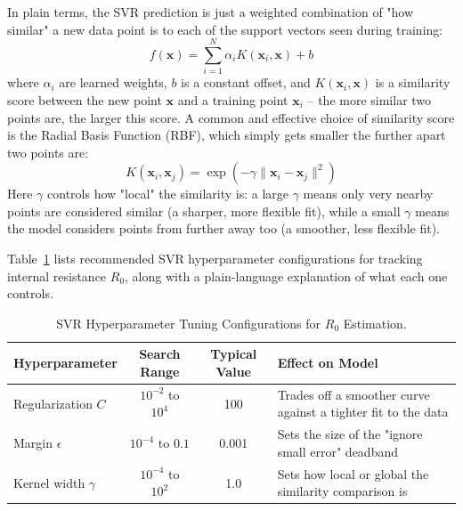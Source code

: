 In plain terms, the SVR prediction is just a weighted combination of "how similar" a new data point is to each of the support vectors seen during training:
\begin{equation}
f(\mathbf{x}) = \sum_{i=1}^N \alpha_i K(\mathbf{x}_i, \mathbf{x}) + b
\label{eq:ch8_svr_predict}
\end{equation}
where $\alpha_i$ are learned weights, $b$ is a constant offset, and $K(\mathbf{x}_i, \mathbf{x})$ is a similarity score between the new point $\mathbf{x}$ and a training point $\mathbf{x}_i$ -- the more similar two points are, the larger this score. A common and effective choice of similarity score is the Radial Basis Function (RBF), which simply gets smaller the further apart two points are:
\begin{equation}
K(\mathbf{x}_i, \mathbf{x}_j) = \exp\left( -\gamma \|\mathbf{x}_i - \mathbf{x}_j\|^2 \right)
\label{eq:ch8_rbf_kernel}
\end{equation}
Here $\gamma$ controls how "local" the similarity is: a large $\gamma$ means only very nearby points are considered similar (a sharper, more flexible fit), while a small $\gamma$ means the model considers points from further away too (a smoother, less flexible fit).

Table~\ref{tab:ch8_svr_hyperparams} lists recommended SVR hyperparameter configurations for tracking internal resistance $R_0$, along with a plain-language explanation of what each one controls.

\begin{table}[htbp]
\centering
\caption{SVR Hyperparameter Tuning Configurations for $R_0$ Estimation.}
\label{tab:ch8_svr_hyperparams}
\renewcommand{\arraystretch}{1.3}
\footnotesize
\begin{tabularx}{\textwidth}{|p{2.6cm}|c|c|X|}
\hline
\textbf{Hyperparameter} & \textbf{Search Range} & \textbf{Typical Value} & \textbf{Effect on Model} \\
\hline
Regularization $C$ & $10^{-2}$ to $10^4$ & 100 & Trades off a smoother curve against a tighter fit to the data \\
\hline
Margin $\epsilon$ & $10^{-4}$ to $0.1$ & 0.001 & Sets the size of the "ignore small error" deadband \\
\hline
Kernel width $\gamma$ & $10^{-4}$ to $10^{2}$ & 1.0 & Sets how local or global the similarity comparison is \\
\hline
\end{tabularx}
\end{table}

